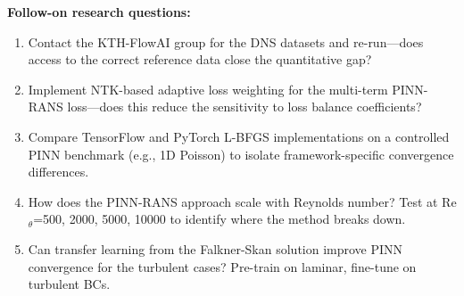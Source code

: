 \documentclass[11pt]{article}
\begin{document}
\noindent\textbf{Follow-on research questions:}
\begin{enumerate}[leftmargin=1.6em,itemsep=0.2em,topsep=0.2em,label=Q\arabic*.]
\item Contact the KTH-FlowAI group for the DNS datasets and re-run---does access to the correct reference data close the quantitative gap?
\item Implement NTK-based adaptive loss weighting for the multi-term PINN-RANS loss---does this reduce the sensitivity to loss balance coefficients?
\item Compare TensorFlow and PyTorch L-BFGS implementations on a controlled PINN benchmark (e.g., 1D Poisson) to isolate framework-specific convergence differences.
\item How does the PINN-RANS approach scale with Reynolds number? Test at Re$_{\theta}$=500, 2000, 5000, 10000 to identify where the method breaks down.
\item Can transfer learning from the Falkner-Skan solution improve PINN convergence for the turbulent cases? Pre-train on laminar, fine-tune on turbulent BCs.
\end{enumerate}
\end{document}
